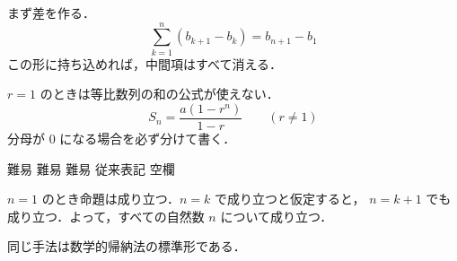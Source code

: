 \documentclass[
  paper=b5j,
  fontsize=8pt,
  jafontsize=8pt,
  line_length=42zw
]{jlreq}
\begin{document}










\begin{mmconfirmationgeneralhint}[1]
まず差を作る．
\[
  \sum_{k=1}^{n}(b_{k+1}-b_k)=b_{n+1}-b_1
\]
この形に持ち込めれば，中間項はすべて消える．
\end{mmconfirmationgeneralhint}

\begin{mmconfirmationadvancedcaution}[2]
$r=1$ のときは等比数列の和の公式が使えない．
\[
  S_n=\dfrac{a(1-r^{n})}{1-r}\qquad(r\neq1)
\]
分母が $0$ になる場合を必ず分けて書く．
\end{mmconfirmationadvancedcaution}


\noindent
{}\hspace{.6em}%
\hspace{.6em}%
\hspace{.6em}%
\hspace{1.6em}%
\hspace{.6em}%
\hspace{.6em}%
\hspace{.6em}%

\medskip
\noindent
難易 \hspace{1.6em}%
難易 \hspace{1.6em}%
難易 \hspace{1.6em}%
従来表記 \hspace{1.6em}%
空欄 \MMBlank[8mm]


\begin{mmconfirmationproof}
$n=1$ のとき命題は成り立つ．$n=k$ で成り立つと仮定すると，
$n=k+1$ でも成り立つ．よって，すべての自然数 $n$ について成り立つ．
\MMQED
\end{mmconfirmationproof}

\noindent
同じ手法は数学的帰納法の標準形である．
\end{document}
